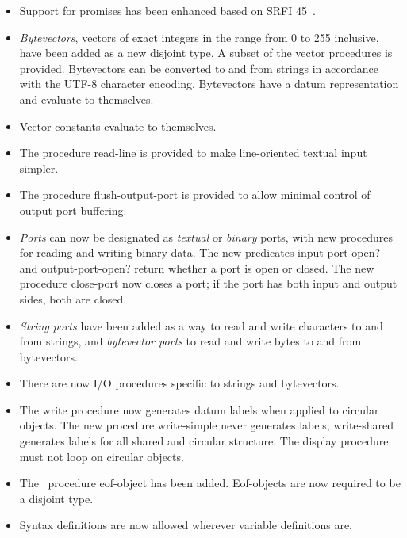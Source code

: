 \begin{itemize}
\item Support for promises has been enhanced based on SRFI 45~\cite{srfi45}.

\item {\em Bytevectors}, vectors of exact integers in the range
from 0 to 255 inclusive, have been added as a new disjoint type.
A subset of the vector procedures is provided.  Bytevectors
can be converted to and from strings in accordance with the UTF-8 character encoding.
Bytevectors have a datum representation and evaluate to themselves.

\item Vector constants evaluate to themselves.

\item The procedure {\cf read-line} is provided to make line-oriented textual input
simpler.

\item The procedure {\cf flush-output-port} is provided to allow minimal
control of output port buffering.

\item {\em Ports} can now be designated as {\em textual} or {\em
binary} ports, with new procedures for reading and writing binary
data.
The new predicates {\cf input-port-open?} and {\cf output-port-open?} return whether a port is open or closed.
The new procedure {\cf close-port} now closes a port; if the port
has both input and output sides, both are closed.

\item {\em String ports} have been added as a way to read and write
characters to and from strings, and {\em bytevector ports} to read
and write bytes to and from bytevectors.

\item There are now I/O procedures specific to strings and bytevectors.

\item The {\cf write} procedure now generates datum labels when applied to
circular objects.  The new procedure {\cf write-simple} never generates
labels; {\cf write-shared} generates labels for all shared and circular
structure.
The {\cf display} procedure must not loop on circular objects.

\item The \rsixrs\ procedure {\cf eof-object} has been added.
Eof-objects are now required to be a disjoint type.

\item Syntax definitions are now allowed wherever variable definitions are.


\end{itemize}

